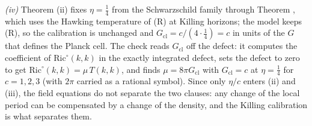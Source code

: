 \emph{(iv)} Theorem (ii) fixes $\eta = \tfrac14$ from the Schwarzschild family through Theorem , which uses the Hawking temperature of (R) at Killing horizons; the model keeps (R), so the calibration is unchanged and $G_{\mathrm{cl}} = c/(4 \cdot \tfrac14) = c$ in units of the $G$ that defines the Planck cell. The check reads $G_{\mathrm{cl}}$ off the defect: it computes the coefficient of $\mathrm{Ric}^{\circ}(k,k)$ in the exactly integrated defect, sets the defect to zero to get $\mathrm{Ric}^{\circ}(k,k) = \mu\,T(k,k)$, and finds $\mu = 8\pi G_{\mathrm{cl}}$ with $G_{\mathrm{cl}} = c$ at $\eta = \tfrac14$ for $c = 1, 2, 3$ (with $2\pi$ carried as a rational symbol). Since only $\eta/c$ enters (ii) and (iii), the field equations do not separate the two clauses: any change of the local period can be compensated by a change of the density, and the Killing calibration is what separates them.
